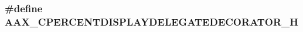 \subsubsection[{A\+A\+X\+\_\+\+C\+P\+E\+R\+C\+E\+N\+T\+D\+I\+S\+P\+L\+A\+Y\+D\+E\+L\+E\+G\+A\+T\+E\+D\+E\+C\+O\+R\+A\+T\+O\+R\+\_\+\+H}]{\setlength{\rightskip}{0pt plus 5cm}\#define A\+A\+X\+\_\+\+C\+P\+E\+R\+C\+E\+N\+T\+D\+I\+S\+P\+L\+A\+Y\+D\+E\+L\+E\+G\+A\+T\+E\+D\+E\+C\+O\+R\+A\+T\+O\+R\+\_\+\+H}\label{a00192_a444efad81dddfb9885476fe11d239387}
